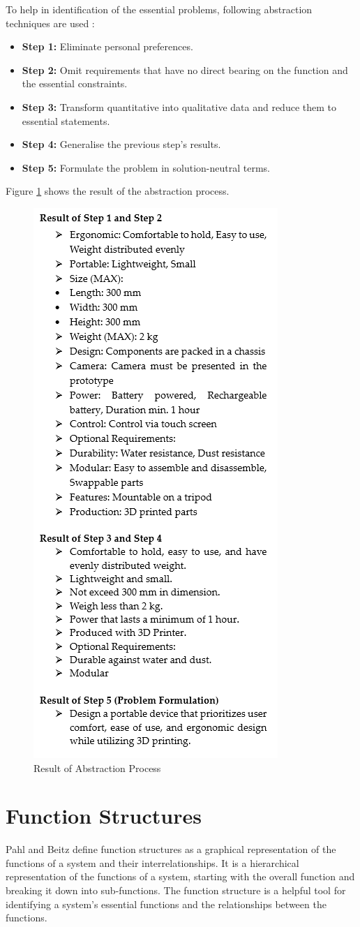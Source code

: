 To help in identification of the essential problems, following abstraction techniques are used \cite[165]{Pahl2007}:

\begin{itemize}
    \item \textbf{Step 1:} Eliminate personal preferences.
    \item \textbf{Step 2:} Omit requirements that have no direct bearing on the function and the essential constraints.
    \item \textbf{Step 3:} Transform quantitative into qualitative data and reduce them to essential statements.
    \item \textbf{Step 4:} Generalise the previous step's results.
    \item \textbf{Step 5:} Formulate the problem in solution-neutral terms.
\end{itemize}

Figure \ref{fig:result-abstraction-process} shows the result of the abstraction process.

\begin{figure}[ht!]
    \centering
    \includegraphics[width=0.4\linewidth]{texs/Part1/chapter3/image/abstractionresult.png}
    \caption{Result of Abstraction Process}
    \label{fig:result-abstraction-process}
\end{figure}


\section{Function Structures}
Pahl and Beitz \cite[31]{Pahl2007} define function structures as a graphical representation of the functions of a system and their interrelationships. It is a hierarchical representation of the functions of a system, starting with the overall function and breaking it down into sub-functions. The function structure is a helpful tool for identifying a system's essential functions and the relationships between the functions.

